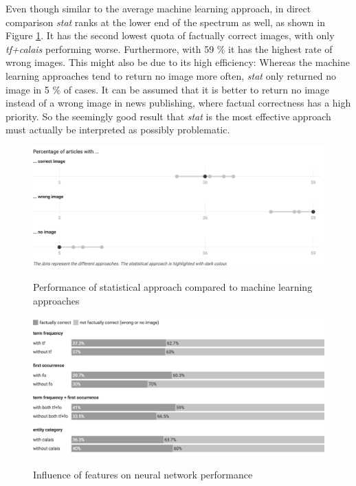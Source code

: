 \documentclass[11pt,a4paper,twoside]{article}
\begin{document}
Even though similar to the average machine learning approach, in direct comparison \emph{stat} ranks at the lower end of the spectrum as well, as shown in Figure \ref{fig:stat-comparison}. It has the second lowest quota of factually correct images, with only \emph{tf+calais} performing worse. Furthermore, with 59 \% it has the highest rate of wrong images. This might also be due to its high efficiency: Whereas the machine learning approaches tend to return no image more often, \emph{stat} only returned no image in 5 \% of cases. It can be assumed that it is better to return no image instead of a wrong image in news publishing, where factual correctness has a high priority. So the seemingly good result that \emph{stat} is the most effective approach must actually be interpreted as possibly problematic.

\begin{figure}[h]
    \caption{Performance of statistical approach compared to machine learning approaches}
    \centering
    \includegraphics[width=0.9\columnwidth]{fig-stat-comparison.png}
    \label{fig:stat-comparison}
\end{figure}

\begin{figure}[h]
    \caption{Influence of features on neural network performance}
    \centering
    \includegraphics[width=\columnwidth]{fig-feature-influence.png}
    \label{fig:feature-influence}
\end{figure}
\end{document}
